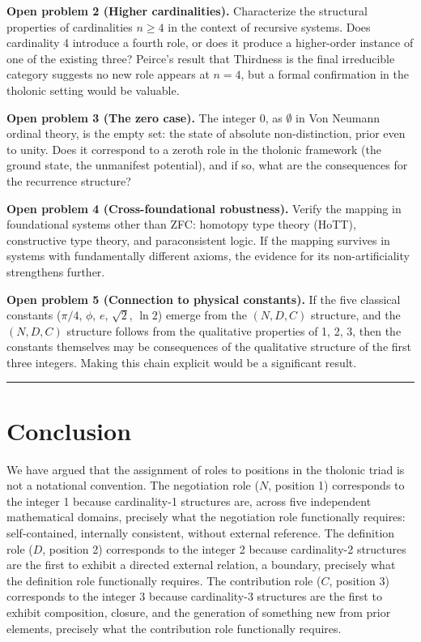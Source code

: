 \documentclass[12pt]{article}
\begin{document}
\textbf{Open problem 2 (Higher cardinalities).} Characterize the
structural properties of cardinalities \(n \ge 4\) in the context of
recursive systems. Does cardinality 4 introduce a fourth role, or does
it produce a higher-order instance of one of the existing three?
Peirce's result that Thirdness is the final irreducible category
suggests no new role appears at \(n = 4\), but a formal confirmation in
the tholonic setting would be valuable.

\textbf{Open problem 3 (The zero case).} The integer 0, as \(\emptyset\)
in Von Neumann ordinal theory, is the empty set: the state of absolute
non-distinction, prior even to unity. Does it correspond to a zeroth
role in the tholonic framework (the ground state, the unmanifest
potential), and if so, what are the consequences for the recurrence
structure?

\textbf{Open problem 4 (Cross-foundational robustness).} Verify the
mapping in foundational systems other than ZFC: homotopy type theory
(HoTT), constructive type theory, and paraconsistent logic. If the
mapping survives in systems with fundamentally different axioms, the
evidence for its non-artificiality strengthens further.

\textbf{Open problem 5 (Connection to physical constants).} If the five
classical constants (\(\pi/4\), \(\phi\), \(e\), \(\sqrt{2}\),
\(\ln 2\)) emerge from the \((N, D, C)\) structure, and the
\((N, D, C)\) structure follows from the qualitative properties of 1, 2,
3, then the constants themselves may be consequences of the qualitative
structure of the first three integers. Making this chain explicit would
be a significant result.

\begin{center}\rule{0.5\linewidth}{0.5pt}\end{center}

\section{Conclusion}\label{conclusion}

We have argued that the assignment of roles to positions in the tholonic
triad is not a notational convention. The negotiation role (\(N\),
position 1) corresponds to the integer 1 because cardinality-1
structures are, across five independent mathematical domains, precisely
what the negotiation role functionally requires: self-contained,
internally consistent, without external reference. The definition role
(\(D\), position 2) corresponds to the integer 2 because cardinality-2
structures are the first to exhibit a directed external relation, a
boundary, precisely what the definition role functionally requires. The
contribution role (\(C\), position 3) corresponds to the integer 3
because cardinality-3 structures are the first to exhibit composition,
closure, and the generation of something new from prior elements,
precisely what the contribution role functionally requires.
\end{document}
